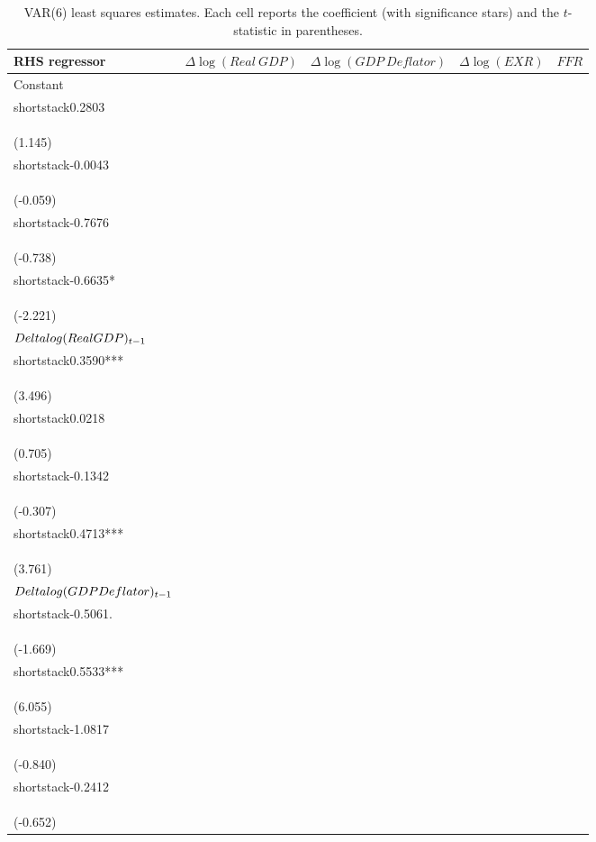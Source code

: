 \begin{table}[H]
\centering
\caption{VAR(6) least squares estimates. Each cell reports the coefficient (with significance stars) and the $t$-statistic in parentheses.}
\label{tab:hw5_q2_var_ols}
\scriptsize
\begin{tabular}{l c c c c}
\hline
RHS regressor & $\Delta\log(Real\ GDP)$ & $\Delta\log(GDP\ Deflator)$ & $\Delta\log(EXR)$ & $FFR$ \\
\hline
Constant & \\shortstack{0.2803\\\\(1.145)} & \\shortstack{-0.0043\\\\(-0.059)} & \\shortstack{-0.7676\\\\(-0.738)} & \\shortstack{-0.6635*\\\\(-2.221)} \\
$\\Delta\\log(Real\\ GDP)_{t-1}$ & \\shortstack{0.3590***\\\\(3.496)} & \\shortstack{0.0218\\\\(0.705)} & \\shortstack{-0.1342\\\\(-0.307)} & \\shortstack{0.4713***\\\\(3.761)} \\
$\\Delta\\log(GDP\\ Deflator)_{t-1}$ & \\shortstack{-0.5061.\\\\(-1.669)} & \\shortstack{0.5533***\\\\(6.055)} & \\shortstack{-1.0817\\\\(-0.840)} & \\shortstack{-0.2412\\\\(-0.652)} \\

\end{tabular}
\end{table}
